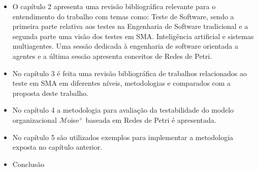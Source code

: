 \begin{itemize}
\item O capítulo 2 apresenta uma revisão bibliográfica relevante para o entendimento do trabalho com temas como: Teste de Software, sendo a primeira parte relativa aos testes na Engenharia de Software tradicional e a segunda parte uma visão dos testes em SMA. Inteligência artificial e sistemas multiagentes. Uma sessão dedicada à engenharia de software orientada a agentes e a última sessão apresenta conceitos de Redes de Petri.

\item No capítulo 3 é feita uma revisão bibliográfica de trabalhos relacionados ao teste em SMA em diferentes níveis, metodologias e comparados com a proposta deste trabalho.

\item No capítulo 4 a metodologia para avaliação da testabilidade do modelo organizacional $\mathcal{M}$oise$^{+}$ baseada em Redes de Petri é apresentada.

\item No capítulo 5 são utilizados exemplos para implementar a metodologia exposta no capítulo anterior.

\item Conclusão
\end{itemize}

